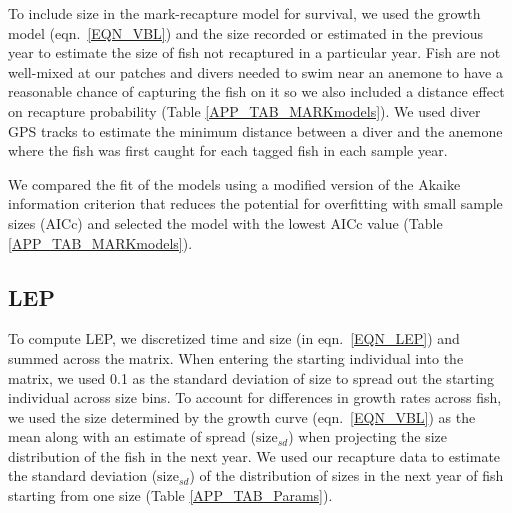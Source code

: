 \documentclass[12pt, oneside]{article}   	%
\begin{document}
To include size in the mark-recapture model for survival, we used the growth model (eqn.\ \ref{EQN_VBL}) and the size recorded or estimated in the previous year to estimate the size of fish not recaptured in a particular year. Fish are not well-mixed at our patches and divers needed to swim near an anemone to have a reasonable chance of capturing the fish on it so we also included a distance effect on recapture probability (Table \ref{APP_TAB_MARKmodels}). We used diver GPS tracks to estimate the minimum distance between a diver and the anemone where the fish was first caught for each tagged fish in each sample year.

We compared the fit of the models using a modified version of the Akaike information criterion that reduces the potential for overfitting with small sample sizes (AICc) and selected the model with the lowest AICc value (Table \ref{APP_TAB_MARKmodels}).




\subsection{LEP} \label{APP_SEC_METHODS_LEP}

To compute LEP, we discretized time and size (in eqn.\ \ref{EQN_LEP}) and summed across the matrix. When entering the starting individual into the matrix, we used 0.1 as the standard deviation of size to spread out the starting individual across size bins. To account for differences in growth rates across fish, we used the size determined by the growth curve (eqn.\ \ref{EQN_VBL}) as the mean along with an estimate of spread ($\text{size}_{sd}$) when projecting the size distribution of the fish in the next year. We used our recapture data to estimate the standard deviation ($\text{size}_{sd}$) of the distribution of sizes in the next year of fish starting from one size (Table \ref{APP_TAB_Params}). %
\end{document}
